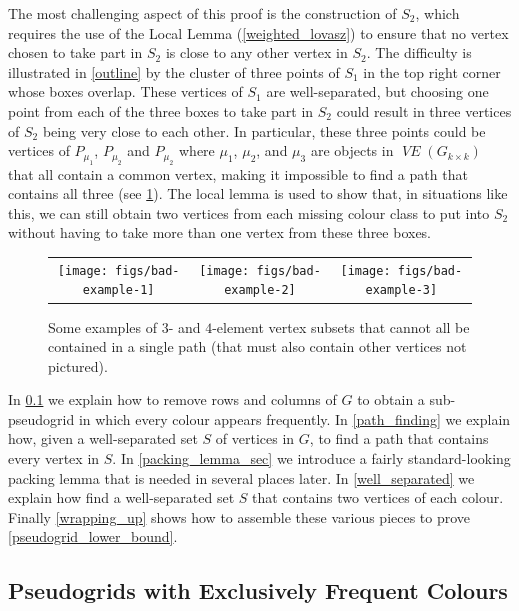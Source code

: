 \documentclass{patmorin}
\DeclareMathOperator{\VE}{\mathit{VE}}
\begin{document}
The most challenging aspect of this proof is the construction of $S_2$, which requires the use of the Local Lemma (\cref{weighted_lovasz}) to ensure that no vertex chosen to take part in $S_2$ is close to any other vertex in $S_2$.  The difficulty is illustrated in \cref{outline} by the cluster of three points of $S_1$ in the top right corner whose boxes overlap.  These vertices of $S_1$ are well-separated, but choosing one point from each of the three boxes to take part in $S_2$ could result in three vertices of $S_2$ being very close to each other.  In particular, these three points could be vertices of $P_{\mu_1}$, $P_{\mu_2}$ and $P_{\mu_2}$ where $\mu_1$, $\mu_2$, and $\mu_3$ are objects in $\VE(G_{k\times k})$ that all contain a common vertex, making it impossible to find a path that contains all three (see \cref{bad_examples}).  The local lemma is used to show that, in situations like this, we can still obtain two vertices from each missing colour class to put into $S_2$ without having to take more than one vertex from these three boxes.

\begin{figure}
  \begin{center}
    \begin{tabular}{ccc}
      \texttt{[image: figs/bad-example-1]} &
      \texttt{[image: figs/bad-example-2]} &
      \texttt{[image: figs/bad-example-3]}
    \end{tabular}
  \end{center}
  \caption{Some examples of $3$- and $4$-element vertex subsets that cannot all be contained in a single path (that must also contain other vertices not pictured).}
  \label{bad_examples}
\end{figure}

In \cref{only_frequent_sec} we explain how to remove rows and columns of $G$ to obtain a sub-pseudogrid in which every colour appears frequently.  In \cref{path_finding} we explain how, given a well-separated set $S$ of vertices in $G$, to find a path that contains every vertex in $S$.  In \cref{packing_lemma_sec} we introduce a fairly standard-looking packing lemma that is needed in several places later.  In \cref{well_separated} we explain how find a well-separated set $S$ that contains two vertices of each colour. Finally \cref{wrapping_up} shows how to assemble these various pieces to prove \cref{pseudogrid_lower_bound}.



\subsection{Pseudogrids with Exclusively Frequent Colours}
\label{only_frequent_sec}
\end{document}
